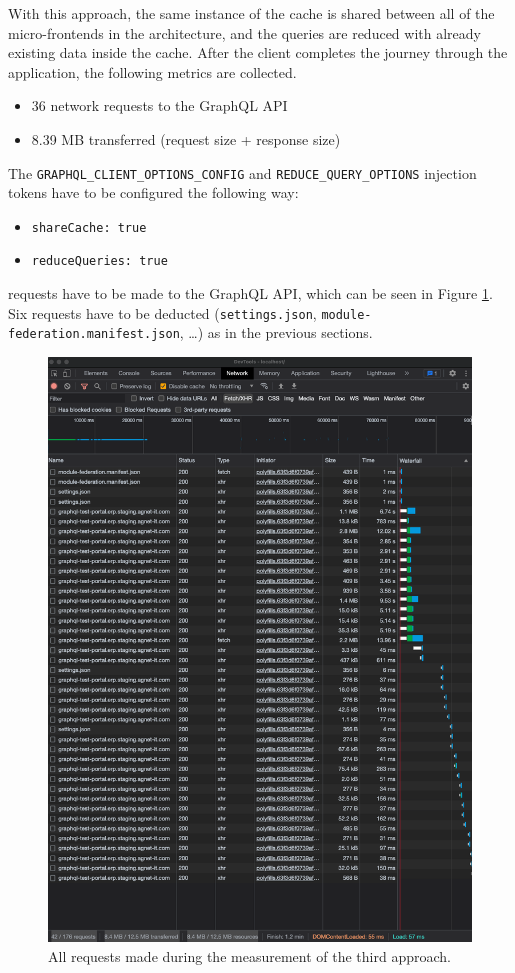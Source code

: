 With this approach, the same instance of the cache is shared between all of the micro-frontends in the architecture, and the queries are reduced with already existing data inside the cache. After the client completes the journey through the application, the following metrics are collected.

\begin{itemize}
  \item 36 network requests to the GraphQL \ac{API}
  \item 8.39 MB transferred (request size + response size)
\end{itemize}

\noindent The \texttt{GRAPHQL\_CLIENT\_OPTIONS\_CONFIG} and \texttt{REDUCE\_QUERY\_OPTIONS} injection tokens have to be configured the following way:

\begin{itemize}
  \item \texttt{shareCache: true}
  \item \texttt{reduceQueries: true}
\end{itemize}

 requests have to be made to the GraphQL \ac{API}, which can be seen in Figure \ref{fig:results:shared-cache-reduction}. Six requests have to be deducted (\texttt{settings.json}, \texttt{module-federation.manifest.json}, \dots) as in the previous sections.

\ifshowImages
\begin{figure}[H]
\centering
\includegraphics[width=0.7\linewidth]{images/results/1-attempt/shared-reduced-cache.png}
\caption{All requests made during the measurement of the third approach.}\label{fig:results:shared-cache-reduction}
\end{figure}
\fi


